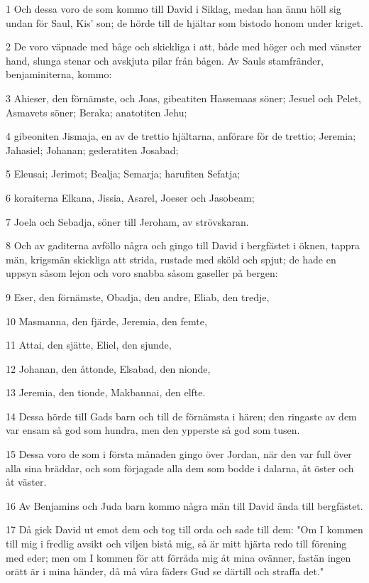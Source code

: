 \par 1 Och dessa voro de som kommo till David i Siklag, medan han ännu höll sig undan för Saul, Kis' son; de hörde till de hjältar som bistodo honom under kriget.
\par 2 De voro väpnade med båge och skickliga i att, både med höger och med vänster hand, slunga stenar och avskjuta pilar från bågen. Av Sauls stamfränder, benjaminiterna, kommo:
\par 3 Ahieser, den förnämste, och Joas, gibeatiten Hassemaas söner; Jesuel och Pelet, Asmavets söner; Beraka; anatotiten Jehu;
\par 4 gibeoniten Jismaja, en av de trettio hjältarna, anförare för de trettio; Jeremia; Jahasiel; Johanan; gederatiten Josabad;
\par 5 Eleusai; Jerimot; Bealja; Semarja; harufiten Sefatja;
\par 6 koraiterna Elkana, Jissia, Asarel, Joeser och Jasobeam;
\par 7 Joela och Sebadja, söner till Jeroham, av strövskaran.
\par 8 Och av gaditerna avföllo några och gingo till David i bergfästet i öknen, tappra män, krigsmän skickliga att strida, rustade med sköld och spjut; de hade en uppsyn såsom lejon och voro snabba såsom gaseller på bergen:
\par 9 Eser, den förnämste, Obadja, den andre, Eliab, den tredje,
\par 10 Masmanna, den fjärde, Jeremia, den femte,
\par 11 Attai, den sjätte, Eliel, den sjunde,
\par 12 Johanan, den åttonde, Elsabad, den nionde,
\par 13 Jeremia, den tionde, Makbannai, den elfte.
\par 14 Dessa hörde till Gads barn och till de förnämsta i hären; den ringaste av dem var ensam så god som hundra, men den ypperste så god som tusen.
\par 15 Dessa voro de som i första månaden gingo över Jordan, när den var full över alla sina bräddar, och som förjagade alla dem som bodde i dalarna, åt öster och åt väster.
\par 16 Av Benjamins och Juda barn kommo några män till David ända till bergfästet.
\par 17 Då gick David ut emot dem och tog till orda och sade till dem: "Om I kommen till mig i fredlig avsikt och viljen bistå mig, så är mitt hjärta redo till förening med eder; men om I kommen för att förråda mig åt mina ovänner, fastän ingen orätt är i mina händer, då må våra fäders Gud se därtill och straffa det."
